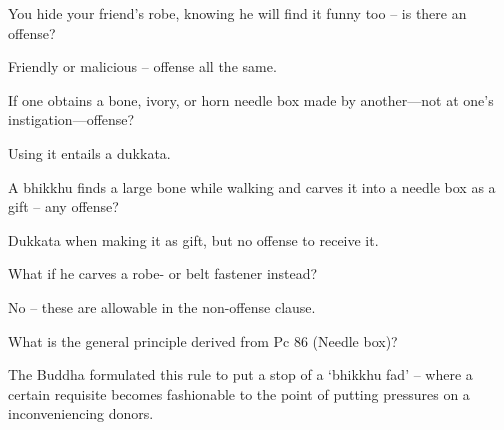 \bigskip

You hide your friend's robe, knowing he will find it funny too – is there an offense?

\bigskip

\begin{solution}
  Friendly or malicious – offense all the same.
\end{solution}


If one obtains a bone, ivory, or horn needle box made by another—not at one’s instigation—offense?

\begin{solution}
  Using it entails a dukkata. 
\end{solution}

\bigskip

A bhikkhu finds a large bone while walking and carves it into a needle box as a gift – any offense?

\begin{solution}
  Dukkata when making it as gift, but no offense to receive it.
\end{solution}

\bigskip

What if he carves a robe- or belt fastener instead?

\begin{solution}
  No – these are allowable in the non-offense clause. 
\end{solution}

\bigskip

What is the general principle derived from Pc 86 (Needle box)?

\begin{solution}
  The Buddha formulated this rule to put a stop of a ‘bhikkhu fad’ – where a
  certain requisite becomes fashionable to the point of putting pressures on a
  inconveniencing donors.
\end{solution}

